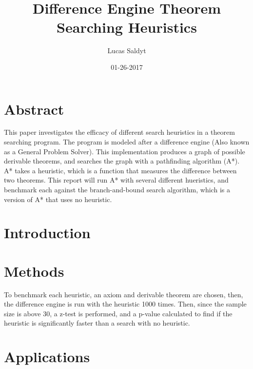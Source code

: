 \documentclass{article}
\title{Difference Engine Theorem Searching Heuristics}
\date{01-26-2017}
\author{Lucas Saldyt}
\begin{document}
\maketitle
{}
\newpage
{}

\section{Abstract}

    This paper investigates the efficacy of different search heuristics in a theorem searching program. 
The program is modeled after a difference engine (Also known as a General Problem Solver).
This implementation produces a graph of possible derivable theorems, and searches the graph with a pathfinding algorithm (A*). 
A* takes a heuristic, which is a function that measures the difference between two theorems.
This report will run A* with several different hueristics, and benchmark each against the branch-and-bound search algorithm, which is a version of A* that uses no heuristic. 

\section{Introduction}



\section{Methods}

To benchmark each heuristic, an axiom and derivable theorem are chosen, then, the difference engine is run with the heuristic 1000 times. 
Then, since the sample size is above 30, a z-test is performed, and a p-value calculated to find if the heuristic is significantly faster than a search with no heuristic.

\section{Applications}
\end{document}
